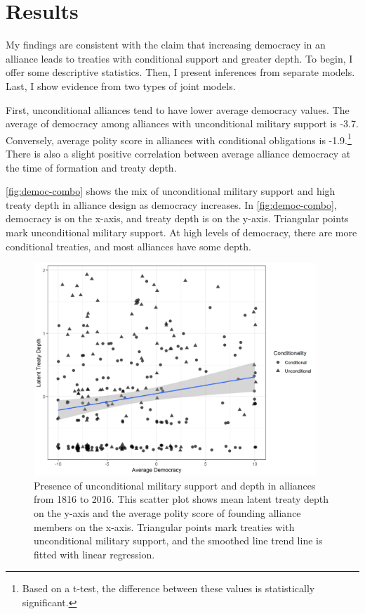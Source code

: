 \documentclass[12pt]{article}
\begin{document}
\section{Results}


My findings are consistent with the claim that increasing democracy in an alliance leads to treaties with conditional support and greater depth. 
To begin, I offer some descriptive statistics.
Then, I present inferences from separate models. 
Last, I show evidence from two types of joint models. 


First, unconditional alliances tend to have lower average democracy values. 
The average of democracy among alliances with unconditional military support is -3.7. 
Conversely, average polity score in alliances with conditional obligations is -1.9.\footnote{Based on a t-test, the difference between these values is statistically significant.} 
There is also a slight positive correlation between average alliance democracy at the time of formation and treaty depth. 

\autoref{fig:democ-combo} shows the mix of unconditional military support and high treaty depth in alliance design as democracy increases. 
In \autoref{fig:democ-combo}, democracy is on the x-axis, and treaty depth is on the y-axis.
Triangular points mark unconditional military support. 
At high levels of democracy, there are more conditional treaties, and most alliances have some depth. 


\begin{figure}[hbtp]
\centering
\includegraphics[width=0.95\textwidth]{../figures/democ-combo.png}
\caption{Presence of unconditional military support and depth in alliances from 1816 to 2016. This scatter plot shows mean latent treaty depth on the y-axis and the average polity score of founding alliance members on the x-axis. Triangular points mark treaties with unconditional military support, and the smoothed line trend line is fitted with linear regression.}
\label{fig:democ-combo}
\end{figure}
\end{document}
